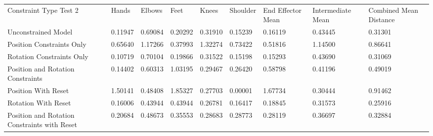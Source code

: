 \begin{table}[]
\begin{tabular}{lllllllll}
Constraint Type Test 2                       & Hands   & Elbows  & Feet    & Knees   & Shoulder & End Effector Mean & Intermediate Mean & Combined Mean Distance \\
Unconstrained Model                          & 0.11947 & 0.69084 & 0.20292 & 0.31910 & 0.15239  & 0.16119           & 0.43445           & 0.31301                \\
Position Constraints Only                    & 0.65640 & 1.17266 & 0.37993 & 1.32274 & 0.73422  & 0.51816           & 1.14500           & 0.86641                \\
Rotation Constraints Only                    & 0.10719 & 0.70104 & 0.19866 & 0.31522 & 0.15198  & 0.15293           & 0.43690           & 0.31069                \\
Position and Rotation Constraints            & 0.14402 & 0.60313 & 1.03195 & 0.29467 & 0.26420  & 0.58798           & 0.41196           & 0.49019                \\
Position With Reset                          & 1.50141 & 0.48408 & 1.85327 & 0.27703 & 0.00001  & 1.67734           & 0.30444           & 0.91462                \\
Rotation With Reset                          & 0.16006 & 0.43944 & 0.43944 & 0.26781 & 0.16417  & 0.18845           & 0.31573           & 0.25916                \\
Position and Rotation Constraints with Reset & 0.20684 & 0.48673 & 0.35553 & 0.28683 & 0.28773  & 0.28119           & 0.36697           & 0.32884               
\end{tabular}
\end{table}
